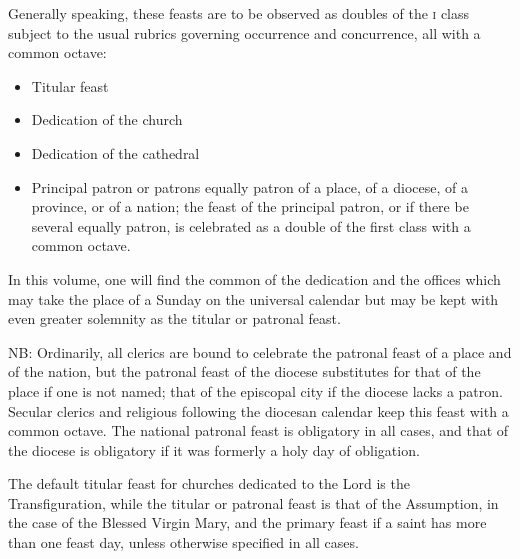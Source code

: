 \begin{enpars}
Generally speaking, these feasts are to be observed as doubles of the \textsc{i} class subject to the usual rubrics governing occurrence and concurrence, all with a common octave:
\begin{itemize}
\item Titular feast
\item Dedication of the church
\item Dedication of the cathedral
\item Principal patron or patrons equally patron of a place, of a diocese, of a province, or of a nation; the feast of the principal patron, or if there be several equally patron, is celebrated as a double of the first class with a common octave.
\end{itemize}

In this volume, one will find the common of the dedication and the offices which may take the place of a Sunday on the universal calendar but may be kept with even greater solemnity as the titular or patronal feast.

NB: Ordinarily, all clerics are bound to celebrate the patronal feast of a place and of the nation, but the patronal feast of the diocese substitutes for that of the place if one is not named; that of the episcopal city if the diocese lacks a patron. Secular clerics and religious following the diocesan calendar keep this feast with a common octave. The national patronal feast is obligatory in all cases, and that of the diocese is obligatory if it was formerly a holy day of obligation.

The default titular feast for churches dedicated to the Lord is the Transfiguration, while the titular or patronal feast is that of the Assumption, in the case of the Blessed Virgin Mary, and the primary feast if a saint has more than one feast day, unless otherwise specified in all cases.


\end{enpars}